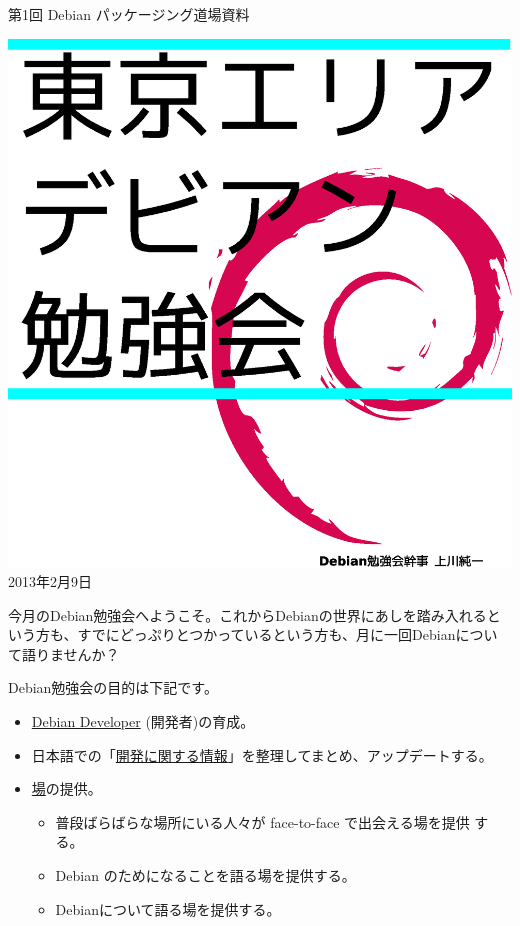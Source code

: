 \documentclass[mingoth,a4paper]{jsarticle}
\newcommand{\debmtgyear}{2013}
\newcommand{\debmtgmonth}{2}
\newcommand{\debmtgdate}{9}
\newcommand{\debmtgnumber}{1}
\begin{document}
\begin{titlepage}
\thispagestyle{empty}


\vspace*{-2cm}
第\debmtgnumber{}回 Debian パッケージング道場資料

\hspace*{-2.4cm}
\includegraphics[width=210mm]{image200801/2008title.eps}\\
\hfill{}\debmtgyear{}年\debmtgmonth{}月\debmtgdate{}日

\end{titlepage}


 今月のDebian勉強会へようこそ。これからDebianの世界にあしを踏み入れると
 いう方も、すでにどっぷりとつかっているという方も、月に一回Debianについ
 て語りませんか？

 Debian勉強会の目的は下記です。

 \begin{itemize}
 \item \underline{Debian Developer} (開発者)の育成。
 \item 日本語での「\underline{開発に関する情報}」を整理してまとめ、アップデートする。
 \item \underline{場}の提供。
 \begin{itemize}
  \item 普段ばらばらな場所にいる人々が face-to-face で出会える場を提供
	する。
  \item Debian のためになることを語る場を提供する。
  \item Debianについて語る場を提供する。
 \end{itemize}
 \end{itemize}		
\end{document}
